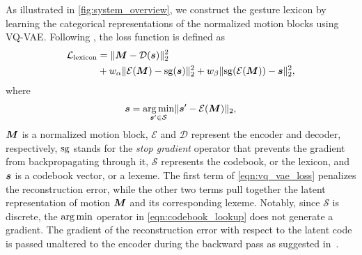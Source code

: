 As illustrated in \fig\ref{fig:system_overview}, we construct the gesture lexicon by learning the categorical representations of the normalized motion blocks using VQ-VAE. Following \cite{oord2017neural}, the loss function is defined as
\begin{align}
    \mathcal{L}_{{\text{lexicon}}} &= \lVert \bm{M}-\mathcal{D}({\bm{s}}) \rVert_2^2 \nonumber\\
    &+  w_{\alpha}\lVert \mathcal{E}(\bm{M}) -\operatorname*{sg}({\bm{s}}) \rVert_2^2 
    +  w_{\beta}\lVert \operatorname*{sg}(\mathcal{E}(\bm{M})) - {\bm{s}} \rVert_2^2,
    \label{eqn:vq_vae_loss}
\end{align}
where
\begin{equation}
    {\bm{s}} = \operatorname*{arg\,min}_{\bm{s}'\in \mathcal{S}} \lVert \bm{s}' - \mathcal{E}(\bm{M}) \rVert_2, \label{eqn:codebook_lookup}
\end{equation}
$\bm{M}$ is a normalized motion block, $\mathcal{E}$ and $\mathcal{D}$ represent the encoder and decoder, respectively, $\operatorname*{sg}$ stands for the \emph{stop gradient} operator that prevents the gradient from backpropagating through it, $\mathcal{S}$ represents the codebook, or the lexicon, and $\bm{s}$ is a codebook vector, or a lexeme. The first term of \eqn\eqref{eqn:vq_vae_loss} penalizes the reconstruction error, while the other two terms pull together the latent representation of motion $\bm{M}$ and its corresponding lexeme. Notably, since $\mathcal{S}$ is discrete, the $\operatorname*{arg\,min}$ operator in \eqn\eqref{eqn:codebook_lookup} does not generate a gradient. The gradient of the reconstruction error with respect to the latent code is passed unaltered to the encoder during the backward pass as suggested in~\cite{oord2017neural}.
%
